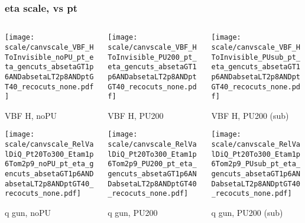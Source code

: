 \documentclass[8pt]{beamer}
\begin{document}
  \begin{frame}
  \frametitle{eta scale, vs pt}
  
  \begin{columns}
   \begin{column}{0.35\textwidth}
     \texttt{[image: scale/canvscale\_VBF\_HToInvisible\_noPU\_pt\_eta\_gencuts\_absetaGT1p6ANDabsetaLT2p8ANDptGT40\_recocuts\_none.pdf]}
     
     VBF H, noPU
    
     \texttt{[image: scale/canvscale\_RelValDiQ\_Pt20To300\_Etam1p6Tom2p9\_noPU\_pt\_eta\_gencuts\_absetaGT1p6ANDabsetaLT2p8ANDptGT40\_recocuts\_none.pdf]}
     
     q gun, noPU
   \end{column}
   \begin{column}{0.35\textwidth}
     \texttt{[image: scale/canvscale\_VBF\_HToInvisible\_PU200\_pt\_eta\_gencuts\_absetaGT1p6ANDabsetaLT2p8ANDptGT40\_recocuts\_none.pdf]}
     
     VBF H, PU200
    
     \texttt{[image: scale/canvscale\_RelValDiQ\_Pt20To300\_Etam1p6Tom2p9\_PU200\_pt\_eta\_gencuts\_absetaGT1p6ANDabsetaLT2p8ANDptGT40\_recocuts\_none.pdf]}
     
     q gun, PU200
   \end{column}
   \begin{column}{0.35\textwidth}
     \texttt{[image: scale/canvscale\_VBF\_HToInvisible\_PUsub\_pt\_eta\_gencuts\_absetaGT1p6ANDabsetaLT2p8ANDptGT40\_recocuts\_none.pdf]}
     
     VBF H, PU200 (sub)
    
     \texttt{[image: scale/canvscale\_RelValDiQ\_Pt20To300\_Etam1p6Tom2p9\_PUsub\_pt\_eta\_gencuts\_absetaGT1p6ANDabsetaLT2p8ANDptGT40\_recocuts\_none.pdf]}
     
     q gun, PU200 (sub)
   \end{column}
  \end{columns}
 \end{frame}
 
\end{document}
